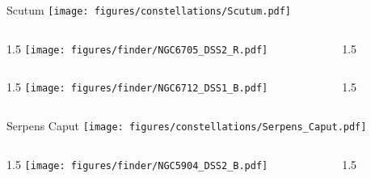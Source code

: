 \documentclass[final]{beamer}
\newlength{\colwidth}
\begin{document}

\begin{frame}[t]{\LARGE Scutum}
  \centering
  \texttt{[image: figures/constellations/Scutum.pdf]}
\end{frame}


\begin{frame}[t]{}
  \begin{columns}[T]
    \begin{column}{1.5\colwidth}
      \centering
      \texttt{[image: figures/finder/NGC6705\_DSS2\_R.pdf]}
    \end{column}
    \begin{column}{1.5\colwidth}
      \Large
      
    \end{column}
  \end{columns}
  \vspace{\fill}
  \begin{columns}[T]
    \begin{column}{1.5\colwidth}
      \centering
      \texttt{[image: figures/finder/NGC6712\_DSS1\_B.pdf]}
    \end{column}
    \begin{column}{1.5\colwidth}
      \Large
      
    \end{column}
  \end{columns}
\end{frame}


\begin{frame}[t]{\LARGE Serpens Caput}
  \centering
  \texttt{[image: figures/constellations/Serpens\_Caput.pdf]}
\end{frame}


\begin{frame}[t]{}
  \begin{columns}[T]
    \begin{column}{1.5\colwidth}
      \centering
      \texttt{[image: figures/finder/NGC5904\_DSS2\_B.pdf]}
    \end{column}
    \begin{column}{1.5\colwidth}
      \Large
      
    \end{column}
  \end{columns}
  \vspace{\fill}
\end{frame}
\end{document}
